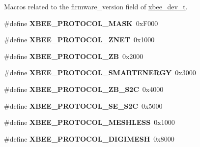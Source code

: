 Macros related to the {\ttfamily firmware\-\_\-version} field of \hyperlink{structxbee__dev__t}{xbee\-\_\-dev\-\_\-t}. \begin{DoxyCompactItemize}
\item 
\hypertarget{group__xbee__device_gacf47336da3a62c0f6c035ae5ef694f6a}{\#define {\bfseries X\-B\-E\-E\-\_\-\-P\-R\-O\-T\-O\-C\-O\-L\-\_\-\-M\-A\-S\-K}~0x\-F000}\label{group__xbee__device_gacf47336da3a62c0f6c035ae5ef694f6a}

\item 
\hypertarget{group__xbee__device_gaba2301cd1c684d8297b252ccf0a56e48}{\#define {\bfseries X\-B\-E\-E\-\_\-\-P\-R\-O\-T\-O\-C\-O\-L\-\_\-\-Z\-N\-E\-T}~0x1000}\label{group__xbee__device_gaba2301cd1c684d8297b252ccf0a56e48}

\item 
\hypertarget{group__xbee__device_ga6da8b301ac3fe5a6325c7fa9862aa42f}{\#define {\bfseries X\-B\-E\-E\-\_\-\-P\-R\-O\-T\-O\-C\-O\-L\-\_\-\-Z\-B}~0x2000}\label{group__xbee__device_ga6da8b301ac3fe5a6325c7fa9862aa42f}

\item 
\hypertarget{group__xbee__device_ga90c85cf78fb81cf3a82106f0723a0130}{\#define {\bfseries X\-B\-E\-E\-\_\-\-P\-R\-O\-T\-O\-C\-O\-L\-\_\-\-S\-M\-A\-R\-T\-E\-N\-E\-R\-G\-Y}~0x3000}\label{group__xbee__device_ga90c85cf78fb81cf3a82106f0723a0130}

\item 
\hypertarget{group__xbee__device_ga0ebb580d372ba39e2cf878b163cd2a53}{\#define {\bfseries X\-B\-E\-E\-\_\-\-P\-R\-O\-T\-O\-C\-O\-L\-\_\-\-Z\-B\-\_\-\-S2\-C}~0x4000}\label{group__xbee__device_ga0ebb580d372ba39e2cf878b163cd2a53}

\item 
\hypertarget{group__xbee__device_gad111f22d8c5e8c8b9e62e791f49098c3}{\#define {\bfseries X\-B\-E\-E\-\_\-\-P\-R\-O\-T\-O\-C\-O\-L\-\_\-\-S\-E\-\_\-\-S2\-C}~0x5000}\label{group__xbee__device_gad111f22d8c5e8c8b9e62e791f49098c3}

\item 
\hypertarget{group__xbee__device_gabc8f957da9c61e7dd5385a013c4bace2}{\#define {\bfseries X\-B\-E\-E\-\_\-\-P\-R\-O\-T\-O\-C\-O\-L\-\_\-\-M\-E\-S\-H\-L\-E\-S\-S}~0x1000}\label{group__xbee__device_gabc8f957da9c61e7dd5385a013c4bace2}

\item 
\hypertarget{group__xbee__device_ga640e6dc87a7153317adc2bc1b758109f}{\#define {\bfseries X\-B\-E\-E\-\_\-\-P\-R\-O\-T\-O\-C\-O\-L\-\_\-\-D\-I\-G\-I\-M\-E\-S\-H}~0x8000}\label{group__xbee__device_ga640e6dc87a7153317adc2bc1b758109f}


\end{DoxyCompactItemize}
